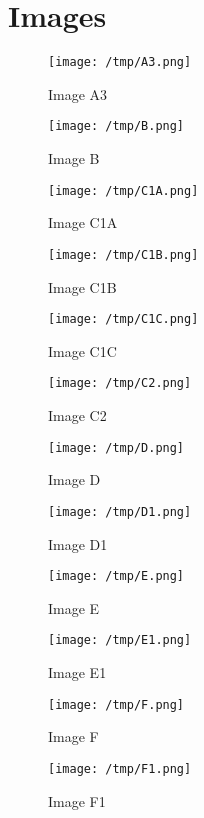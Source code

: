 \documentclass{article}
\begin{document}
\section*{Images}

\begin{figure}[htbp]  %
  \centering
  \texttt{[image: /tmp/A3.png]}  %
  \caption{Image A3}
\end{figure}

\begin{figure}[htbp]
  \centering
  \texttt{[image: /tmp/B.png]}
  \caption{Image B}
\end{figure}

\begin{figure}[htbp]
  \centering
  \texttt{[image: /tmp/C1A.png]}
  \caption{Image C1A}
\end{figure}

\begin{figure}[htbp]
  \centering
  \texttt{[image: /tmp/C1B.png]}
  \caption{Image C1B}
\end{figure}

\begin{figure}[htbp]
  \centering
  \texttt{[image: /tmp/C1C.png]}
  \caption{Image C1C}
\end{figure}

\begin{figure}[htbp]
  \centering
  \texttt{[image: /tmp/C2.png]}
  \caption{Image C2}
\end{figure}

\begin{figure}[htbp]
  \centering
  \texttt{[image: /tmp/D.png]}
  \caption{Image D}
\end{figure}

\begin{figure}[htbp]
  \centering
  \texttt{[image: /tmp/D1.png]}
  \caption{Image D1}
\end{figure}

\begin{figure}[htbp]
  \centering
  \texttt{[image: /tmp/E.png]}
  \caption{Image E}
\end{figure}

\begin{figure}[htbp]
  \centering
  \texttt{[image: /tmp/E1.png]}
  \caption{Image E1}
\end{figure}

\begin{figure}[htbp]
  \centering
  \texttt{[image: /tmp/F.png]}
  \caption{Image F}
\end{figure}


\begin{figure}[htbp]
  \centering
  \texttt{[image: /tmp/F1.png]}
  \caption{Image F1}
\end{figure}
\end{document}
